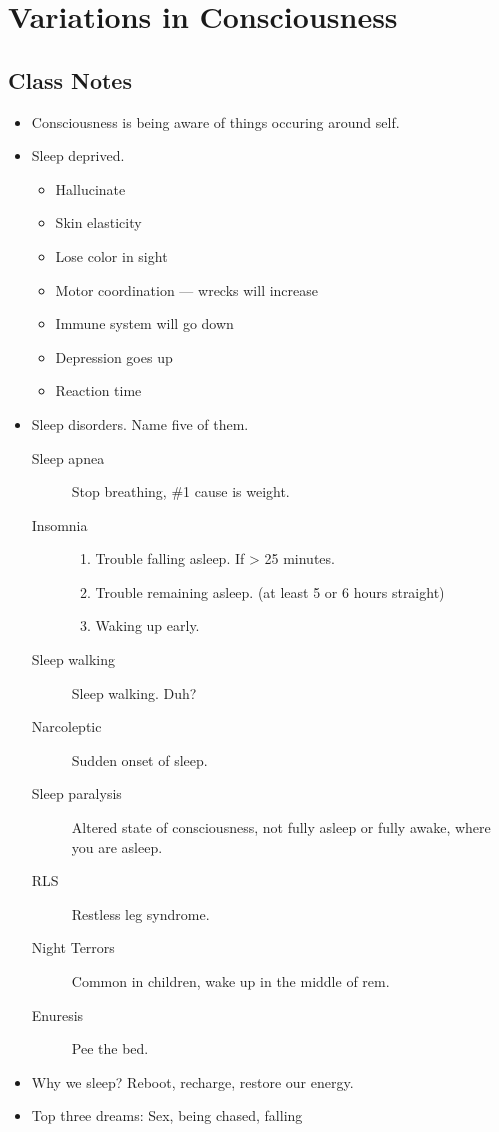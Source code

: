 \documentclass{article}
\begin{document}
\section{Variations in Consciousness}
\subsection{Class Notes}
\begin{itemize}
    \item Consciousness is being aware of things occuring around self.
    \item Sleep deprived.
    \begin{itemize}
        \item Hallucinate
        \item Skin elasticity
        \item Lose color in sight
        \item Motor coordination --- wrecks will increase
        \item Immune system will go down
        \item Depression goes up
        \item Reaction time

    \end{itemize}

    \item Sleep disorders. Name five of them.
    \begin{description}
        \item [Sleep apnea] Stop breathing, \#1 cause is weight.
        \item [Insomnia]
        \begin{enumerate}
            \item Trouble falling asleep. If > 25 minutes.
            \item Trouble remaining asleep. (at least 5 or 6 hours straight)
            \item Waking up early.
        \end{enumerate}

        \item [Sleep walking] Sleep walking. Duh?
        \item [Narcoleptic] Sudden onset of sleep.
        \item [Sleep paralysis] Altered state of consciousness, not fully asleep or fully awake, where you are asleep.
        \item [RLS] Restless leg syndrome.
        \item [Night Terrors] Common in children, wake up in the middle of rem.
        \item [Enuresis] Pee the bed.
    \end{description}

    \item Why we sleep? Reboot, recharge, restore our energy.
    \item Top three dreams: Sex, being chased, falling
\end{itemize}
\end{document}
